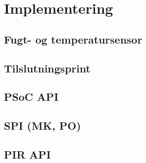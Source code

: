 \chapter{Implementering}


\section{Fugt- og temperatursensor}


\section{Tilslutningsprint}


\section{PSoC API}


\section{SPI (MK, PO)}


\section{PIR API}



